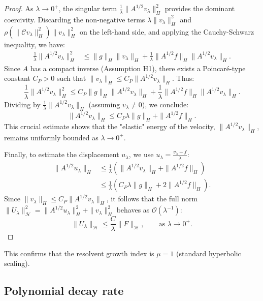 \documentclass[11pt,reqno]{amsart}
\theoremstyle{remark}
\begin{document}
\begin{proof}
As $\lambda \to 0^+$, the singular term $\frac{1}{\lambda} \|A^{1/2} v_\lambda\|_H^2$ provides the dominant coercivity. Discarding the non-negative terms $\lambda \|v_\lambda\|_H^2$ and $\rho(\|\mathcal C v_\lambda\|_H^2) \|v_\lambda\|_H^2$ on the left-hand side, and applying the Cauchy-Schwarz inequality, we have:
\begin{align*}
\frac{1}{\lambda} \|A^{1/2} v_\lambda\|_H^2 &\le \|g\|_H \|v_\lambda\|_H + \frac{1}{\lambda} \|A^{1/2} f\|_H \|A^{1/2} v_\lambda\|_H.
\end{align*}
Since $A$ has a compact inverse (Assumption H1), there exists a Poincaré-type constant $C_P > 0$ such that $\|v_\lambda\|_H \le C_P \|A^{1/2} v_\lambda\|_H$. Thus:
\begin{equation}
\frac{1}{\lambda} \|A^{1/2} v_\lambda\|_H^2 \le C_P \|g\|_H \|A^{1/2} v_\lambda\|_H + \frac{1}{\lambda} \|A^{1/2} f\|_H \|A^{1/2} v_\lambda\|_H.
\end{equation}
Dividing by $\frac{1}{\lambda} \|A^{1/2} v_\lambda\|_H$ (assuming $v_\lambda \neq 0$), we conclude:
\begin{equation}
\|A^{1/2} v_\lambda\|_H \le C_P \lambda \|g\|_H + \|A^{1/2} f\|_H.
\end{equation}
This crucial estimate shows that the "elastic" energy of the velocity, $\|A^{1/2} v_\lambda\|_H$, remains uniformly bounded as $\lambda \to 0^+$.

Finally, to estimate the displacement $u_\lambda$, we use $u_\lambda = \frac{v_\lambda + f}{\lambda}$:
\begin{align*}
\|A^{1/2} u_\lambda\|_H &\le \frac{1}{\lambda} \left( \|A^{1/2} v_\lambda\|_H + \|A^{1/2} f\|_H \right) \\
&\le \frac{1}{\lambda} \left( C_P \lambda \|g\|_H + 2\|A^{1/2} f\|_H \right).
\end{align*}
Since $\|v_\lambda\|_H \le C_P \|A^{1/2} v_\lambda\|_H$, it follows that the full norm $\|U_\lambda\|_{\mathcal{H}}^2 = \|A^{1/2} u_\lambda\|_H^2 + \|v_\lambda\|_H^2$ behaves as $\mathcal{O}(\lambda^{-1})$:
\begin{equation}
\|U_\lambda\|_{\mathcal H} \le \frac{C}{\lambda} \|F\|_{\mathcal H}, \qquad \text{as } \lambda \to 0^+.
\end{equation}
\end{proof}


This confirms that the resolvent growth index is $\mu = 1$ (standard hyperbolic scaling).

\subsection{Polynomial decay rate}
\end{document}
